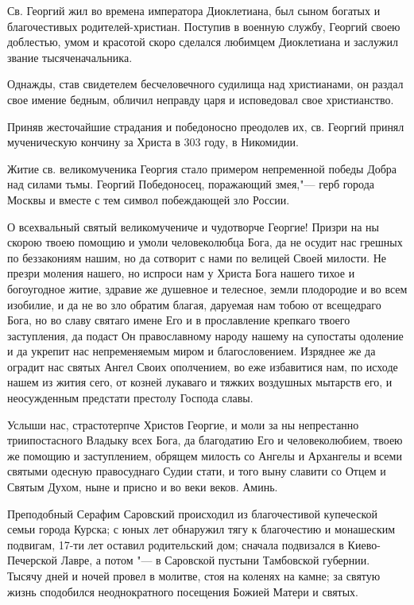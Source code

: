  

Св. Георгий жил во времена императора Диоклетиана, был сыном богатых и благочестивых родителей-христиан. Поступив в военную службу, Георгий своею доблестью, умом и красотой скоро сделался любимцем Диоклетиана и заслужил звание тысяченачальника. 

Однажды, став свидетелем бесчеловечного судилища над христианами, он раздал свое имение бедным, обличил неправду царя и исповедовал свое христианство. 

Приняв жесточайшие страдания и победоносно преодолев их, св. Георгий принял мученическую кончину за Христа в 303 году, в Никомидии. 

Житие св. великомученика Георгия стало примером непременной победы Добра над силами тьмы. Георгий Победоносец, поражающий змея,"--- герб города Москвы и вместе с тем символ побеждающей зло России.



О всехвальный святый великомучениче и чудотворче Георгие! Призри на ны скорою твоею помощию и умоли человеколюбца Бога, да не осудит нас грешных по беззакониям нашим, но да сотворит с нами по велицей Своей милости. Не презри моления нашего, но испроси нам у Христа Бога нашего тихое и богоугодное житие, здравие же душевное и телесное, земли плодородие и во всем изобилие, и да не во зло обратим благая, даруемая нам тобою от всещедраго Бога, но во славу святаго имене Его и в прославление крепкаго твоего заступления, да подаст Он православному народу нашему на супостаты одоление и да укрепит нас непременяемым миром и благословением. Изряднее же да оградит нас святых Ангел Своих ополчением, во еже избавитися нам, по исходе нашем из жития сего, от козней лукаваго и тяжких воздушных мытарств его, и неосужденным предстати престолу Господа славы. 

Услыши нас, страстотерпче Христов Георгие, и моли за ны непрестанно триипостасного Владыку всех Бога, да благодатию Его и человеколюбием, твоею же помощию и заступлением, обрящем милость со Ангелы и Архангелы и всеми святыми одесную правосуднаго Судии стати, и того выну славити со Отцем и Святым Духом, ныне и присно и во веки веков. Аминь.
\mychapterending

 
Преподобный Серафим Саровский происходил из благочестивой купеческой семьи города Курска; с юных лет обнаружил тягу к благочестию и монашеским подвигам, 17-ти лет оставил родительский дом; сначала подвизался в Киево-Печерской Лавре, а потом "--- в Саровской пустыни Тамбовской губернии. Тысячу дней и ночей провел в молитве, стоя на коленях на камне; за святую жизнь сподобился неоднократного посещения Божией Матери и святых. 


